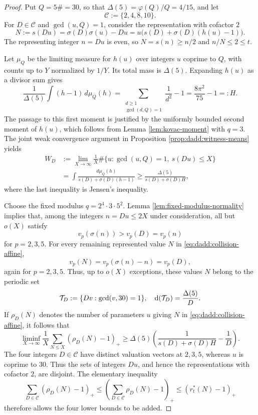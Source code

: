\documentclass[11pt,letterpaper,reqno]{amsart}
\numberwithin{equation}{section}
\theoremstyle{remark}
\renewcommand{\leq}{\leqslant}
\renewcommand{\geq}{\geqslant}
\begin{document}
\begin{proof}
Put $Q=5\#=30$, so that $\Delta(5)=\varphi(Q)/Q=4/15$, and let
\[
 \mathcal{C}:=\{2,4,8,10\}.
\]
For $D\in\mathcal{C}$ and $\gcd(u,Q)=1$, consider the representation with cofactor $2$
\begin{equation}
\label{eq:dadd:collision-affine}
 N:=s(Du)=\sigma(D)\sigma(u)-Du
 =u\bigl(s(D)+\sigma(D)(h(u)-1)\bigr).
\end{equation}
The representing integer $n=Du$ is even, so $N=s(n)\geq n/2$ and
$n/N\leq2\leq t$.

Let $\mu_Q$ be the limiting measure for $h(u)$ over integers
$u$ coprime to $Q$, with counts up to $Y$ normalized by $1/Y$.
Its total mass is $\Delta(5)$. Expanding $h(u)$ as a divisor
sum gives
\[
 \frac1{\Delta(5)}\int(h-1)\,d\mu_Q(h)
 =\sum_{\substack{d\geq1\\\gcd(d,Q)=1}}\frac1{d^2}-1
 =\frac{8\pi^2}{75}-1=:H.
\]
The passage to this first moment is justified by the uniformly bounded
second moment of $h(u)$, which follows from
Lemma \ref{lem:kovac-moment} with $q=3$. The joint weak convergence argument in
Proposition \ref{prop:dadd:witness-means} yields
\begin{align*}
 W_D
 &:=\lim_{X\to\infty}\frac1X
 \#\{u:\gcd(u,Q)=1,\ s(Du)\leq X\}\\
 &=\int\frac{d\mu_Q(h)}{s(D)+\sigma(D)(h-1)}
 \geq\frac{\Delta(5)}{s(D)+\sigma(D)H},
\end{align*}
where the last inequality is Jensen's inequality.

Choose the fixed modulus $q=2^4\cdot3\cdot5^2$.
Lemma \ref{lem:fixed-modulus-normality} implies that, among the integers
$n=Du\leq2X$ under consideration, all but $o(X)$ satisfy
\[
 v_p(\sigma(n))>v_p(D)=v_p(n)
\]
for $p=2,3,5$.
For every remaining represented value $N$ in \eqref{eq:dadd:collision-affine},
\[
 v_p(N)=v_p(\sigma(n)-n)=v_p(D),
\]
again for $p=2,3,5$.
Thus, up to $o(X)$ exceptions, these values $N$ belong to the
periodic set
\[
 \mathcal{T}_D:=\{Dv:\gcd(v,30)=1\},
 \quad \textup{d}(\mathcal{T}_D)=\frac{\Delta(5)}{D}.
\]
If $\rho_D(N)$ denotes the number of parameters $u$ giving $N$ in
\eqref{eq:dadd:collision-affine}, it follows that
\[
 \liminf_{X\to\infty}\frac1X
 \sum_{N\leq X}(\rho_D(N)-1)_+
 \geq\Delta(5)\left(
 \frac1{s(D)+\sigma(D)H}-\frac1D\right).
\]
The four integers $D\in\mathcal{C}$ have distinct valuation vectors at
$2,3,5$, whereas $u$ is coprime to $30$. Thus the sets of integers $Du$,
and hence the representations with cofactor $2$, are disjoint. The elementary inequality
\[
 \sum_{D\in\mathcal{C}}(\rho_D(N)-1)_+
 \leq\left(\sum_{D\in\mathcal{C}}\rho_D(N)-1\right)_+
 \leq(r_t^*(N)-1)_+
\]
therefore allows the four lower bounds to be added.


\end{proof}
\end{document}
